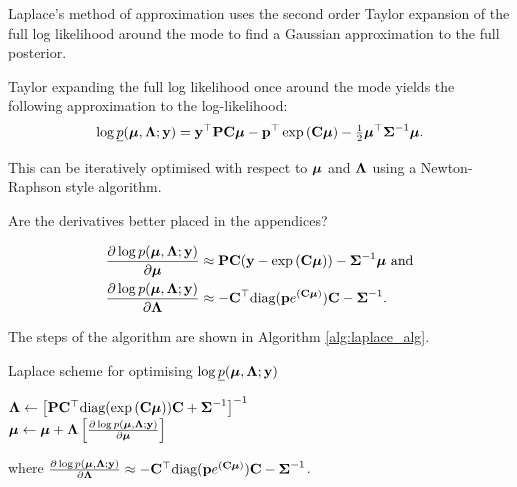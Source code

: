 \documentclass[times, doublespace]{anzsauth}
\newcommand{\mgc}[1]{{\color{blue}#1}}
\begin{document}
	Laplace's method of approximation uses the second order Taylor expansion of the full log likelihood around
	the mode to find a Gaussian approximation to the full posterior. 
		
		
	\noindent Taylor expanding the full log likelihood once around the mode yields the following approximation to 
	the	log-likelihood:
	\begin{align*}
		\log \underline{p}({\boldsymbol \mu}, {\boldsymbol \Lambda}; {\bf y}) = {\bf y}^\top{\bf P}{\bf C}{\boldsymbol\mu} - {\bf p}^\top\exp \left ({\bf C} {\boldsymbol \mu} \right ) - \tfrac{1}{2} {\boldsymbol \mu}^\top {\boldsymbol\Sigma}^{-1} {\boldsymbol \mu}. 
	\end{align*}
		
	\noindent This can be iteratively optimised with respect to ${\boldsymbol \mu}$ and ${\boldsymbol \Lambda}$ using a Newton-Raphson style
	algorithm.
	
	\mgc{Are the derivatives better placed in the appendices?}
	
	\begin{align*}
		\frac{\partial \log p({\boldsymbol \mu}, {\boldsymbol \Lambda}; {\bf y})}{\partial {\boldsymbol\mu}}     & \approx {\bf P} {\bf C} ({\bf y} - \exp{({\bf C}{\boldsymbol\mu})}) - {\boldsymbol \Sigma}^{-1} {\boldsymbol \mu} \text{ and} \\
		\frac{\partial \log p({\boldsymbol \mu}, {\boldsymbol \Lambda}; {\bf y})}{\partial {\boldsymbol\Lambda}} & \approx - {\bf C}^\top \text{diag}({\bf p} e^{({\bf C} {\boldsymbol \mu})}) {\bf C} - {\boldsymbol \Sigma}^{-1}.   
	\end{align*}
		
	\noindent The steps of the algorithm are shown in Algorithm \ref{alg:laplace_alg}.
		
	\begin{algorithm}
		\caption{Laplace scheme for optimising $\log \underline{p}({\boldsymbol \mu}, {\boldsymbol \Lambda}; {\bf y})$}
		\label{alg:laplace_alg}
		\begin{algorithmic}
			\STATE ${\boldsymbol \Lambda} \leftarrow \left [{\bf P} {\bf C}^\top \text{diag}(\exp{({\bf C}{\boldsymbol\mu})}) {\bf C} + {\boldsymbol \Sigma}^{-1} \right ]^{-1}$ \\ [1ex] 
			\STATE ${\boldsymbol \mu} \leftarrow {\boldsymbol\mu} + {\boldsymbol \Lambda} \left [ \frac{\partial \log p({\boldsymbol \mu}, {\boldsymbol \Lambda}; {\bf y})}{\partial {\boldsymbol\mu}} \right ]$ \\ [1ex]
			\ENDWHILE
		\end{algorithmic}
		where $\frac{\partial \log p({\boldsymbol \mu}, {\boldsymbol \Lambda}; {\bf y})}{\partial {\boldsymbol\Lambda}} \approx - {\bf C}^\top \text{diag}({\bf p} e^{({\bf C} {\boldsymbol \mu})}) {\bf C} - {\boldsymbol \Sigma}^{-1}$.
	\end{algorithm}
		
\end{document}
